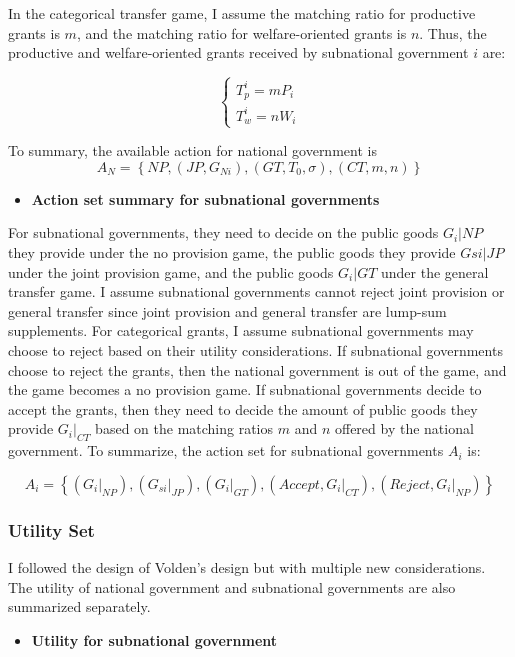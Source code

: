 In the categorical transfer game, I assume the matching ratio for productive grants is $m$\label{generalandcategorical}, and the matching ratio for welfare-oriented grants is $n$. Thus, the productive and welfare-oriented grants received by subnational government $i$ are:

\begin{equation}
    \left\{\begin{array}{l}
        T_p^i=m P_i \\
        T_w^i=n W_i
    \end{array}\right.\label{mrmatrix}
\end{equation}

To summary, the available action for national government is $$A_N=\left\{N P,\left(J P, G_{Ni}\right),\left(G T, T_0, \sigma\right),(C T, m,n)\right\} $$

\begin{itemize}
    \item \textbf{Action set summary for subnational governments}
\end{itemize}

For subnational governments, they need to decide on the public goods $G_i|{NP}$ they provide under the no provision game, the public goods they provide $G{si}|{JP}$ under the joint provision game, and the public goods $G_i|{GT}$ under the general transfer game. I assume subnational governments cannot reject joint provision or general transfer since joint provision and general transfer are lump-sum supplements. For categorical grants, I assume subnational governments may choose to reject based on their utility considerations. If subnational governments choose to reject the grants, then the national government is out of the game, and the game becomes a no provision game. If subnational governments decide to accept the grants, then they need to decide the amount of public goods they provide $G_i|_{CT}$ based on the matching ratios $m$ and $n$ offered by the national government. To summarize, the action set for subnational governments $A_i$ \label{action} is:

$$A_i=\left\{\left(G_i|_{NP}\right),\left(G_{si}|_{JP} \right),\left(G_i|_{GT} \right),\left(Accept,G_i|_{CT}\right), (Reject,G_i|_{NP})\right\} $$

\subsubsection{Utility Set}

I followed the design of Volden's design but with multiple new considerations. The utility of national government and subnational governments are also summarized separately.
\begin{itemize}
    \item \textbf{Utility for subnational government}
\end{itemize}

